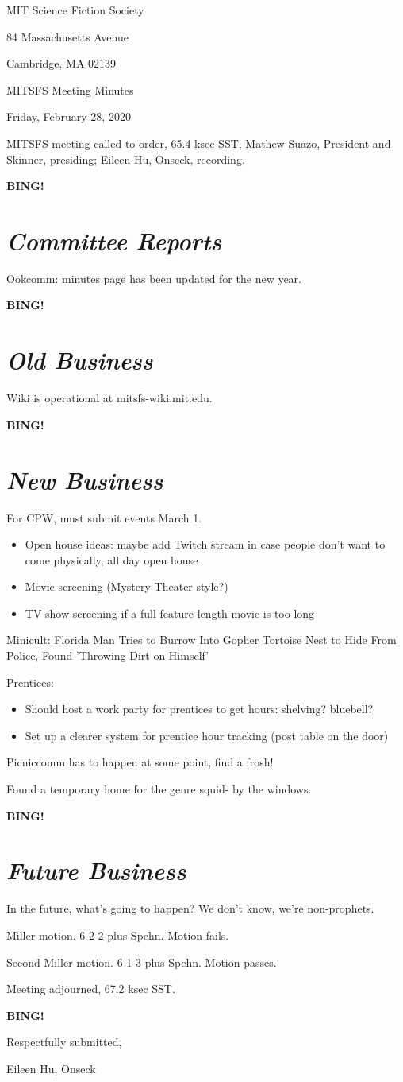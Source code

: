 \documentclass[10pt]{article}
\newcommand{\bing}{{\bf BING!} }
\newcommand{\goto}[1]{\bing \vskip 12pt \section*{{\em{#1}}}}
\newcommand{\ps}{ plus Spehn\xspace}
\newcommand{\skinner}{Mathew Suazo, President and Skinner\xspace}
\newcommand{\onseck}{Eileen Hu, Onseck\xspace}
\newcommand{\meetingdate}{Friday, February 28, 2020}
\begin{document}
\begin{center}

MIT Science Fiction Society

84 Massachusetts Avenue

Cambridge, MA 02139

\vspace{12pt}

MITSFS Meeting Minutes

\meetingdate

\end{center}

\vspace{18pt}

\setlength{\parskip}{6pt}

\noindent
MITSFS meeting called to order, 65.4 ksec SST,
\skinner, presiding; \onseck, recording.

\goto{Committee Reports}

Ookcomm: minutes page has been updated for the new year.

\goto{Old Business}

Wiki is operational at mitsfs-wiki.mit.edu.

\goto{New Business}

For CPW, must submit events March 1.
\begin{itemize}
\item Open house ideas: maybe add Twitch stream in case people don't want to come physically, all day open house
\item Movie screening (Mystery Theater style?)
\item TV show screening if a full feature length movie is too long
\end{itemize}

Minicult: Florida Man Tries to Burrow Into Gopher Tortoise Nest to Hide From Police, Found 'Throwing Dirt on Himself'

Prentices:
\begin{itemize}
\item Should host a work party for prentices to get hours: shelving? bluebell?
\item Set up a clearer system for prentice hour tracking (post table on the door)
\end{itemize}

Picniccomm has to happen at some point, find a frosh!

Found a temporary home for the genre squid- by the windows.

\goto{Future Business}

In the future, what's going to happen? We don't know, we're non-prophets.

Miller motion. 6-2-2 \ps. Motion fails.

Second Miller motion. 6-1-3 \ps. Motion passes.

\noindent
Meeting adjourned, 67.2 ksec SST.

\bing
\vspace{18pt}

\centerline{Respectfully submitted,}
\centerline{\onseck}
\end{document}
